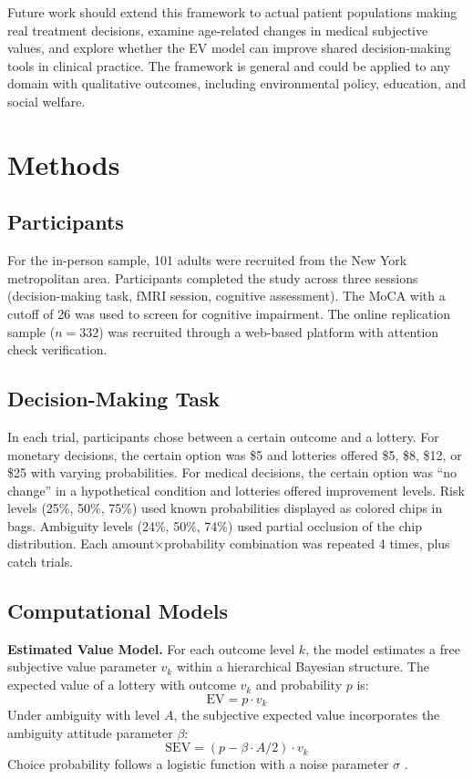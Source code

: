 \documentclass[11pt]{article}
\begin{document}
Future work should extend this framework to actual patient populations making real treatment decisions, examine age-related changes in medical subjective values, and explore whether the EV model can improve shared decision-making tools in clinical practice. The framework is general and could be applied to any domain with qualitative outcomes, including environmental policy, education, and social welfare.

\section{Methods}

\subsection{Participants}

For the in-person sample, 101 adults were recruited from the New York metropolitan area. Participants completed the study across three sessions (decision-making task, fMRI session, cognitive assessment). The MoCA \citep{nasreddine2005montreal} with a cutoff of 26 was used to screen for cognitive impairment. The online replication sample ($n = 332$) was recruited through a web-based platform with attention check verification.

\subsection{Decision-Making Task}

In each trial, participants chose between a certain outcome and a lottery. For monetary decisions, the certain option was \$5 and lotteries offered \$5, \$8, \$12, or \$25 with varying probabilities. For medical decisions, the certain option was ``no change'' in a hypothetical condition and lotteries offered improvement levels. Risk levels (25\%, 50\%, 75\%) used known probabilities displayed as colored chips in bags. Ambiguity levels (24\%, 50\%, 74\%) used partial occlusion of the chip distribution. Each amount$\times$probability combination was repeated 4 times, plus catch trials.

\subsection{Computational Models}

\textbf{Estimated Value Model.} For each outcome level $k$, the model estimates a free subjective value parameter $v_k$ within a hierarchical Bayesian structure. The expected value of a lottery with outcome $v_k$ and probability $p$ is:
\begin{equation}
\text{EV} = p \cdot v_k
\end{equation}
Under ambiguity with level $A$, the subjective expected value incorporates the ambiguity attitude parameter $\beta$:
\begin{equation}
\text{SEV} = (p - \beta \cdot A/2) \cdot v_k
\end{equation}
Choice probability follows a logistic function with a noise parameter $\sigma$ \citep{mcfadden1974conditional}.
\end{document}
